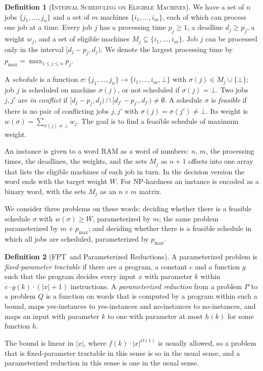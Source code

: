 \documentclass[11pt,a4paper]{article}
\theoremstyle{definition}
\newtheorem{definition}{Definition}
\newcommand{\pmax}{p_{\max}}
\newcommand{\ProbEM}{\textsc{Interval Scheduling on Eligible Machines}}
\newcommand{\bigO}{O}
\newcommand{\FPT}{\textnormal{\textsf{FPT}}}
\newcommand{\NP}{\textnormal{\textsf{NP}}}
\begin{document}
\begin{definition}[\ProbEM]
We have a set of $n$ jobs $\{j_1,\ldots,j_n\}$ and a set of $m$ machines
$\{i_1,\ldots,i_m\}$, each of which can process one job at a time. Every job $j$ has a
processing time $p_j\ge 1$, a deadline $d_j\ge p_j$, a weight $w_j$, and a set of eligible
machines $M_j\subseteq\{i_1,\ldots,i_m\}$. Job $j$ can be processed only in the interval
$[d_j-p_j,d_j)$. We denote the largest processing time by $\pmax=\max_{1\le j\le n}p_j$.

A \emph{schedule} is a function $\sigma:\{j_1,\ldots,j_n\}\to\{i_1,\ldots,i_m,\bot\}$ with
$\sigma(j)\in M_j\cup\{\bot\}$; job $j$ is scheduled on machine $\sigma(j)$, or not
scheduled if $\sigma(j)=\bot$. Two jobs $j,j'$ are \emph{in conflict} if
$[d_j-p_j,d_j)\cap[d_{j'}-p_{j'},d_{j'})\neq\emptyset$. A schedule $\sigma$ is
\emph{feasible} if there is no pair of conflicting jobs $j,j'$ with
$\sigma(j)=\sigma(j')\neq\bot$. Its weight is $w(\sigma)=\sum_{\sigma(j)\neq\bot}w_j$.
The goal is to find a feasible schedule of maximum weight.
\end{definition}

An instance is given to a word RAM as a word of numbers: $n$, $m$, the processing times,
the deadlines, the weights, and the sets $M_j$ as $n+1$ offsets into one array that lists
the eligible machines of each job in turn. In the decision version the word ends with the
target weight $W$.
For \NP-hardness an instance is encoded as a binary word, with the sets $M_j$ as an
$n\times m$ matrix.

We consider three problems on these words: deciding whether there is a feasible schedule
$\sigma$ with $w(\sigma)\ge W$, parameterized by $m$; the same problem parameterized by
$m+\pmax$; and deciding whether there is a feasible schedule in which all jobs are
scheduled, parameterized by $\pmax$.

\begin{definition}[\FPT\ and Parameterized Reductions]
A parameterized problem is \emph{fixed-parameter tractable} if there are a program, a
constant $c$ and a function $g$ such that the program decides every input $x$ with
parameter $k$ within $c\cdot g(k)\cdot(|x|+1)$ instructions. A \emph{parameterized
reduction} from a problem $P$ to a problem $Q$ is a function on words that is computed by a
program within such a bound, maps yes-instances to yes-instances and no-instances to
no-instances, and maps an input with parameter $k$ to one with parameter at most $h(k)$
for some function $h$.
\end{definition}
The bound is linear in $|x|$, where $f(k)\cdot|x|^{\bigO(1)}$ is usually allowed, so a
problem that is fixed-parameter tractable in this sense is so in the usual sense, and a
parameterized reduction in this sense is one in the usual sense.
\end{document}

